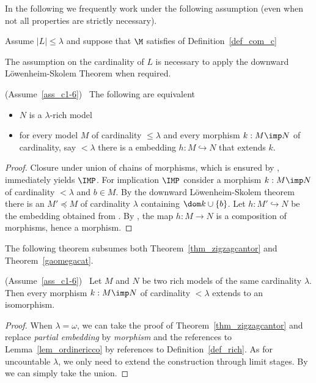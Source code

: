 In the following we frequently work under the following assumption (even when not all properties are strictly necessary).
 
\begin{assumption}\label{ass_c1-6}
Assume  $|L|\le\lambda$ and suppose that $\M$ satisfies  of Definition~\ref{def_com_c}
\end{assumption} 
 
The assumption on the cardinality of $L$ is necessary to apply the downward L\"owen\-heim-Skolem Theorem when required.

\begin{proposition}\label{prop_6.1}
(Assume~\ref{ass_c1-6})  \  The following are equivalent
\begin{itemize}
\item[1.] $N$ is a $\lambda$-rich model
\item[2.] for every model $M$ of cardinality $\le\lambda$ and every morphism $k:M\imp N$ of cardinality, say $<\lambda$ there is a embedding $h:M\hookrightarrow N$ that extends $k$.
\end{itemize}
\end{proposition}

\begin{proof}
Closure under union of chains of morphisms, which is ensured by , immediately yields $\IMP$.
For implication $\IMP$ consider a morphism $k:M\imp N$ of cardinality $<\lambda$ and $b\in M$.
By the downward L\"owenheim-Skolem theorem there is an  $M'\preceq M$ of cardinality $\lambda$ containing $\dom k \cup\{b\}$.
Let $h:M'\hookrightarrow N$ be the embedding obtained from .
By , the map $h:M\to N$ is a composition of morphisms, hence a morphism.
\end{proof}

The following theorem subsumes both Theorem~\ref{thm_zigzagcantor} and Theorem~\ref{gaomegacat}.

\begin{theorem}\label{thm_riccozigzag}
(Assume~\ref{ass_c1-6})  \  Let $M$ and $N$ be two rich models of the same cardinality $\lambda$.
Then every morphism $k:M\imp N$ of cardinality $<\lambda$ extends to an isomorphism.
\end{theorem}

\begin{proof}
When $\lambda=\omega$, we can take the proof of Theorem~\ref{thm_zigzagcantor} and replace \textit{partial embedding\/} by \textit{morphism\/} and the references to Lemma~\ref{lem_ordinericco} by references to Definition~\ref{def_rich}.
As for uncountable $\lambda$, we only need to extend the construction through limit stages.
By  we can simply take the union.
\end{proof}

